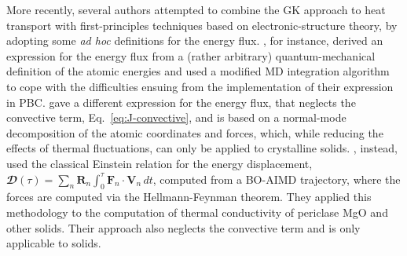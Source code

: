 More recently, several authors attempted to combine the GK approach to heat transport with first-principles techniques based on electronic-structure theory, by adopting some \emph{ad hoc} definitions for the energy flux. \citet{Kang2017}, for instance, derived an expression for the energy flux from a (rather arbitrary) quantum-mechanical definition of the atomic energies and used a modified MD integration algorithm to cope with the difficulties ensuing from the implementation of their expression in PBC. 
\citet{Carbogno:2017gc} gave a different expression for the energy flux, that neglects the convective term, Eq.~\eqref{eq:J-convective}, and is based on a normal-mode decomposition of the atomic coordinates and forces, which, while reducing the effects of thermal fluctuations, can only be applied to crystalline solids.
\citet{English2017}, instead, used the classical Einstein relation for the energy displacement, $\mathbfcal{D}(\tau) = \sum_n \mathbf{R}_n \int_0^\tau \mathbf{F}_n \cdot \mathbf{V}_n \, dt$, computed from a BO-AIMD trajectory, where the forces are computed via the Hellmann-Feynman theorem. They applied this methodology to the computation of thermal conductivity of periclase MgO \cite{Tse2018} and other solids. Their approach also neglects the convective term and is only applicable to solids.



